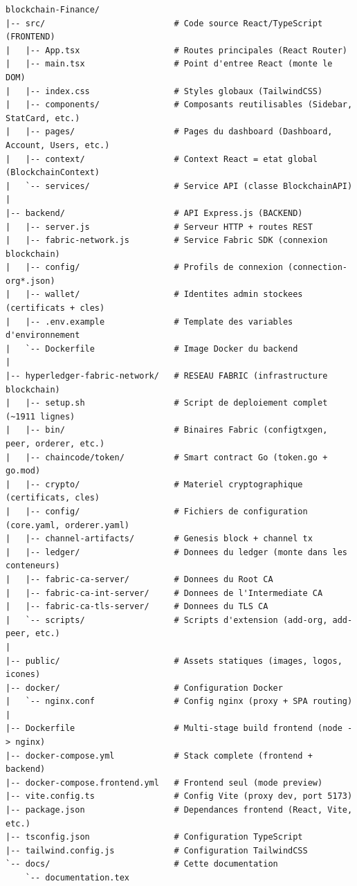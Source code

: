 \documentclass[12pt,a4paper,twoside]{report}
\begin{document}
\begin{lstlisting}[caption=Arborescence du projet, basicstyle=\ttfamily\footnotesize]
blockchain-Finance/
|-- src/                          # Code source React/TypeScript (FRONTEND)
|   |-- App.tsx                   # Routes principales (React Router)
|   |-- main.tsx                  # Point d'entree React (monte le DOM)
|   |-- index.css                 # Styles globaux (TailwindCSS)
|   |-- components/               # Composants reutilisables (Sidebar, StatCard, etc.)
|   |-- pages/                    # Pages du dashboard (Dashboard, Account, Users, etc.)
|   |-- context/                  # Context React = etat global (BlockchainContext)
|   `-- services/                 # Service API (classe BlockchainAPI)
|
|-- backend/                      # API Express.js (BACKEND)
|   |-- server.js                 # Serveur HTTP + routes REST
|   |-- fabric-network.js         # Service Fabric SDK (connexion blockchain)
|   |-- config/                   # Profils de connexion (connection-org*.json)
|   |-- wallet/                   # Identites admin stockees (certificats + cles)
|   |-- .env.example              # Template des variables d'environnement
|   `-- Dockerfile                # Image Docker du backend
|
|-- hyperledger-fabric-network/   # RESEAU FABRIC (infrastructure blockchain)
|   |-- setup.sh                  # Script de deploiement complet (~1911 lignes)
|   |-- bin/                      # Binaires Fabric (configtxgen, peer, orderer, etc.)
|   |-- chaincode/token/          # Smart contract Go (token.go + go.mod)
|   |-- crypto/                   # Materiel cryptographique (certificats, cles)
|   |-- config/                   # Fichiers de configuration (core.yaml, orderer.yaml)
|   |-- channel-artifacts/        # Genesis block + channel tx
|   |-- ledger/                   # Donnees du ledger (monte dans les conteneurs)
|   |-- fabric-ca-server/         # Donnees du Root CA
|   |-- fabric-ca-int-server/     # Donnees de l'Intermediate CA
|   |-- fabric-ca-tls-server/     # Donnees du TLS CA
|   `-- scripts/                  # Scripts d'extension (add-org, add-peer, etc.)
|
|-- public/                       # Assets statiques (images, logos, icones)
|-- docker/                       # Configuration Docker
|   `-- nginx.conf                # Config nginx (proxy + SPA routing)
|
|-- Dockerfile                    # Multi-stage build frontend (node -> nginx)
|-- docker-compose.yml            # Stack complete (frontend + backend)
|-- docker-compose.frontend.yml   # Frontend seul (mode preview)
|-- vite.config.ts                # Config Vite (proxy dev, port 5173)
|-- package.json                  # Dependances frontend (React, Vite, etc.)
|-- tsconfig.json                 # Configuration TypeScript
|-- tailwind.config.js            # Configuration TailwindCSS
`-- docs/                         # Cette documentation
    `-- documentation.tex
\end{lstlisting}
\end{document}
